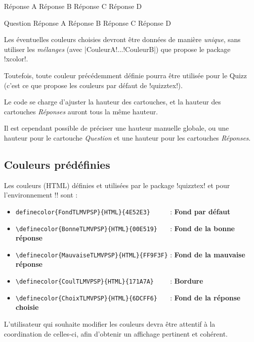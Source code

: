 \documentclass[french,a4paper,11pt]{article}
\begin{document}
\begin{DemoCode}
	{Réponse A}
	{Réponse B}
	{Réponse C}
	{Réponse D}
\end{DemoCode}

\begin{DemoCode}
\QuizzPrendrePlace
	{Question}
	{Réponse A}
	{Réponse B}
	{Réponse C}
	{Réponse D}
\end{DemoCode}

\begin{tipblock}
Les éventuelles couleurs choisies devront être données de manière \textit{unique}, sans utiliser les \textit{mélanges} (avec \motcletex|CouleurA!...!CouleurB|) que propose le package \packagetex!xcolor!.

Toutefois, toute couleur précédemment définie pourra être utilisée pour le Quizz (c'est ce que propose les couleurs par défaut de \packagetex!quizztex!).
\end{tipblock}

\begin{importantblock}
Le code se charge d'ajuster la hauteur des cartouches, et la hauteur des cartouches \textit{Réponses} auront tous la même hauteur.

\smallskip

Il est cependant possible de préciser une hauteur manuelle globale, ou une hauteur pour le cartouche \textit{Question} et une hauteur pour les cartouches \textit{Réponses}.
\end{importantblock}

\subsection{Couleurs prédéfinies}

\begin{tipblock}
Les couleurs (HTML) définies et utilisées par le package \packagetex!quizztex! et pour l'environnement \motcletex!\QuizzMillions! sont :

\begin{itemize}
	\item \verb!definecolor{FondTLMVPSP}{HTML}{4E52E3}     ! : \textcolor{FondTLMVPSP}{\textsf{\textbf{Fond par défaut}}}
	\item \verb!\definecolor{BonneTLMVPSP}{HTML}{00E519}   ! : \textcolor{BonneTLMVPSP}{\textsf{\textbf{Fond de la bonne réponse}}}
	\item \verb!\definecolor{MauvaiseTLMVPSP}{HTML}{FF9F3F}! : \textcolor{MauvaiseTLMVPSP}{\textsf{\textbf{Fond de la mauvaise réponse}}}
	\item \verb!\definecolor{CoulTLMVPSP}{HTML}{171A7A}    ! : \textcolor{CoulTLMVPSP}{\textsf{\textbf{Bordure}}}
	\item \verb!\definecolor{ChoixTLMVPSP}{HTML}{6DCFF6}   ! : \textcolor{ChoixTLMVPSP}{\textsf{\textbf{Fond de la réponse choisie}}}
\end{itemize}

L'utilisateur qui souhaite modifier les couleurs devra être attentif à la coordination de celles-ci, afin d'obtenir un affichage pertinent et cohérent.
\end{tipblock}
\end{document}
